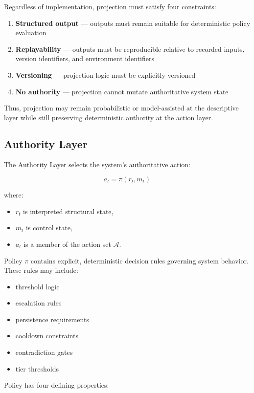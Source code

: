 \documentclass[11pt]{article}
\begin{document}
Regardless of implementation, projection must satisfy four constraints:

\begin{enumerate}
  \item \textbf{Structured output} — outputs must remain suitable for deterministic policy evaluation
  \item \textbf{Replayability} — outputs must be reproducible relative to recorded inputs, version identifiers, and environment identifiers
  \item \textbf{Versioning} — projection logic must be explicitly versioned
  \item \textbf{No authority} — projection cannot mutate authoritative system state
\end{enumerate}

Thus, projection may remain probabilistic or model-assisted at the descriptive layer while still preserving deterministic authority at the action layer.

\subsection{Authority Layer}

The Authority Layer selects the system’s authoritative action:

\[
a_t = \pi(r_t, m_t)
\]

where:

\begin{itemize}
  \item $r_t$ is interpreted structural state,
  \item $m_t$ is control state,
  \item $a_t$ is a member of the action set $\mathcal{A}$.
\end{itemize}

Policy $\pi$ contains explicit, deterministic decision rules governing system behavior. These rules may include:

\begin{itemize}
  \item threshold logic
  \item escalation rules
  \item persistence requirements
  \item cooldown constraints
  \item contradiction gates
  \item tier thresholds
\end{itemize}

Policy has four defining properties:
\end{document}
